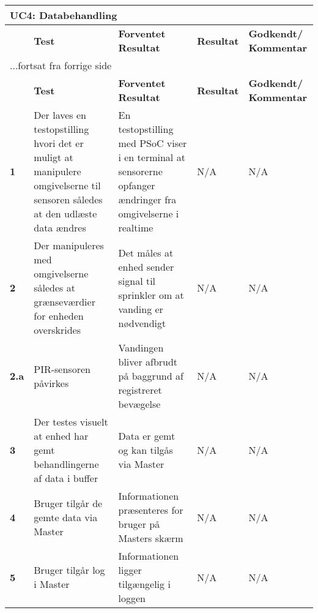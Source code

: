 
\begin{center}
\begin{longtable}{|p{}|p{}|p{}|p{}|p{}|} %
\hline
\multicolumn{5}{|l|}{\textbf{UC4: Databehandling}} \\ \hline
\multicolumn{1}{|c|}{} &
\textbf{Test} &
\textbf{Forventet \newline Resultat} &
\textbf{Resultat} &
\textbf{Godkendt/ \newline Kommentar} \\ \hline 
\endfirsthead

\multicolumn{5}{l}{...fortsat fra forrige side} \\ \hline 
\multicolumn{1}{|c|}{} &
\textbf{Test} &
\textbf{Forventet \newline Resultat} &
\textbf{Resultat} &
\textbf{Godkendt/ \newline Kommentar} \\ \hline 
\endhead

\textbf{1}	&Der laves en testopstilling hvori det er muligt at manipulere omgivelserne til sensoren således at den udlæste data ændres
			&En testopstilling med PSoC viser i en terminal at sensorerne opfanger ændringer fra omgivelserne i realtime
			&N/A
			&N/A \\ \hline 
			
\textbf{2}	&Der manipuleres med omgivelserne således at grænseværdier for enheden overskrides
			&Det måles at enhed sender signal til sprinkler om at vanding er nødvendigt
			&N/A
			&N/A \\ \hline 
			
\textbf{2.a}	&PIR-sensoren påvirkes
			&Vandingen bliver afbrudt på baggrund af registreret bevægelse 
			&N/A
			&N/A \\ \hline 
			
\textbf{3}	&Der testes visuelt at enhed har gemt behandlingerne af data i buffer
			&Data er gemt og kan tilgås via Master
			&N/A
			&N/A \\ \hline 

\textbf{4}	&Bruger tilgår de gemte data via Master
			&Informationen præsenteres for bruger på Masters skærm
			&N/A
			&N/A \\ \hline 
			
\textbf{5}	&Bruger tilgår log i Master 
			&Informationen ligger tilgængelig i loggen
			&N/A
			&N/A \\ \hline 
			

\end{longtable}
\end{center}

